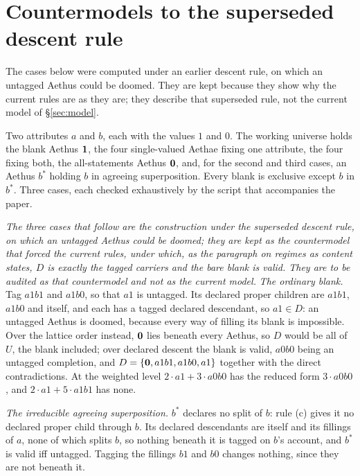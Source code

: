 \section{Countermodels to the superseded descent rule}\label{app:countermodels}

\noindent The cases below were computed under an earlier descent rule, on which an untagged Aethus could be doomed. They are kept because they show why the current rules are as they are; they describe that superseded rule, not the current model of \S\ref{sec:model}.

Two attributes $a$ and $b$, each with the values $1$ and $0$. The working universe holds the blank Aethus $\mathbf{1}$, the four single-valued Aethae fixing one attribute, the four fixing both, the all-statements Aethus $\mathbf{0}$, and, for the second and third cases, an Aethus $b^{\ast}$ holding $b$ in agreeing superposition. Every blank is exclusive except $b$ in $b^{\ast}$. Three cases, each checked exhaustively by the script that accompanies the paper.

\noindent\noindent\textit{The three cases that follow are the construction under the superseded descent rule, on which an untagged Aethus could be doomed; they are kept as the countermodel that forced the current rules, under which, as the paragraph on regimes as content states, $D$ is exactly the tagged carriers and the bare blank is valid. They are to be audited as that countermodel and not as the current model.} \emph{The ordinary blank.} Tag $a1b1$ and $a1b0$, so that $a1$ is untagged. Its declared proper children are $a1b1$, $a1b0$ and itself, and each has a tagged declared descendant, so $a1 \in D$: an untagged Aethus is doomed, because every way of filling its blank is impossible. Over the lattice order instead, $\mathbf{0}$ lies beneath every Aethus, so $D$ would be all of $U$, the blank included; over declared descent the blank is valid, $a0b0$ being an untagged completion, and $D = \{\mathbf{0}, a1b1, a1b0, a1\}$ together with the direct contradictions. At the weighted level $2 \cdot a1 + 3 \cdot a0b0$ has the reduced form $3 \cdot a0b0$, and $2 \cdot a1 + 5 \cdot a1b1$ has none.

\noindent\emph{The irreducible agreeing superposition.} $b^{\ast}$ declares no split of $b$: rule (c) gives it no declared proper child through $b$. Its declared descendants are itself and its fillings of $a$, none of which splits $b$, so nothing beneath it is tagged on $b$'s account, and $b^{\ast}$ is valid iff untagged. Tagging the fillings $b1$ and $b0$ changes nothing, since they are not beneath it.

